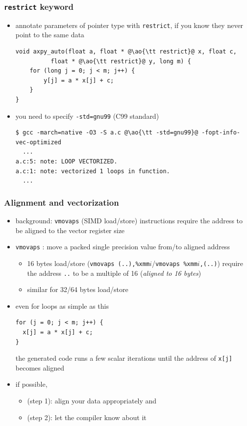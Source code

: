 \documentclass[12pt,dvipdfmx]{beamer}
\newcommand{\ao}[1]{{\color{blue}#1}}
\begin{document}
\begin{frame}[fragile]
\frametitle{{\tt restrict} keyword}
\begin{itemize}
\item annotate parameters of pointer type with {\tt restrict},
  if you know they never point to the same data
\begin{lstlisting}
void axpy_auto(float a, float * @\ao{\tt restrict}@ x, float c, 
          float * @\ao{\tt restrict}@ y, long m) {
    for (long j = 0; j < m; j++) {
        y[j] = a * x[j] + c;
    }
}
\end{lstlisting}
\item you need to specify \ao{\tt -std=gnu99} (C99 standard)
\begin{lstlisting}
$ gcc -march=native -O3 -S a.c @\ao{\tt -std=gnu99}@ -fopt-info-vec-optimized
  ...
a.c:5: note: LOOP VECTORIZED.
a.c:1: note: vectorized 1 loops in function.
  ...
\end{lstlisting} %
\end{itemize}
\end{frame}

\iffalse
\begin{frame}[fragile]
\frametitle{Alignment and vectorization}
\begin{itemize}
\item background:
{\tt vmovaps} (SIMD load/store) instructions require
the address to be aligned to the vector register size
\item {\tt vmov\ao{a}ps} :
  move a packed single precision value from/to \ao{a}ligned address

\begin{itemize}
\item 16 bytes load/store
  ({\tt vmovaps (..),\%xmm$i$}/{\tt vmovaps \%xmm$i$,(..)})
  require the address \ao{\tt ..} to be a multiple of 16
  ({\it aligned to 16 bytes})
\item similar for 32/64 bytes load/store
\end{itemize}

\item even for loops as simple as this
\begin{lstlisting}
for (j = 0; j < m; j++) {
  x[j] = a * x[j] + c;
}
\end{lstlisting}
the generated code runs a few scalar iterations
until the address of {\tt x[j]} becomes aligned

\item if possible,
  \begin{itemize}
  \item (step 1): align your data appropriately and
  \item (step 2): let the compiler know about it
  \end{itemize}
\end{itemize}
\end{frame}
\end{document}
